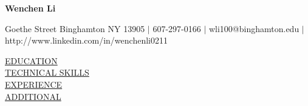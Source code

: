 \documentclass{article}
\begin{document}
\begin{center}
\textbf{Wenchen Li}
\end{center}

 Goethe Street Binghamton NY 13905 $|$
607-297-0166 $|$
wli100@binghamton.edu $|$
http://www.linkedin.com/in/wenchenli0211

\noindent
\uline{EDUCATION} \\

\noindent
\uline{TECHNICAL SKILLS} \\

\noindent
\uline{EXPERIENCE} \\

\noindent
\uline{ADDITIONAL} \\
\end{document}
